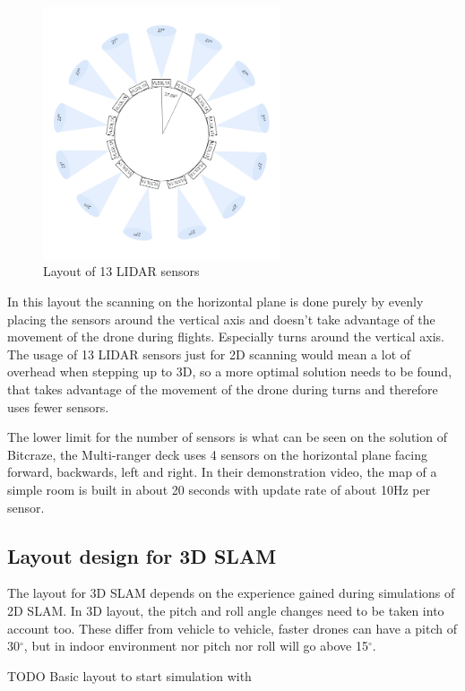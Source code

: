\begin{figure}[ht]
    \centering
    \includegraphics[width=70mm, keepaspectratio]{figures/2d_slam_13sensors.png}
    \caption{Layout of 13 LIDAR sensors}
    \label{fig:2d_13sensor_layout}
\end{figure}

In this layout the scanning on the horizontal plane is done purely by evenly placing the sensors 
around the vertical axis and doesn't take advantage of the movement of the drone during flights. 
Especially turns around the vertical axis. The usage of 13 LIDAR sensors just for 2D scanning would mean 
a lot of overhead when stepping up to 3D, so a more optimal solution needs to be found, that takes
advantage of the movement of the drone during turns and therefore uses fewer sensors. 

The lower limit for the number of sensors is what can be seen on the solution of Bitcraze, 
the Multi-ranger deck\cite{BitcrazeMultirangerDeck} uses 4 sensors on the horizontal plane facing forward, 
backwards, left and right. In their demonstration video, the map of a simple room is built in 
about 20 seconds with update rate of about 10Hz per sensor. 

\subsection{Layout design for 3D SLAM}
The layout for 3D SLAM depends on the experience gained during simulations of 2D SLAM. In 3D layout,
the pitch and roll angle changes need to be taken into account too. These differ from vehicle to vehicle,
faster drones can have a pitch of 30$^{\circ}$, but in indoor environment nor pitch nor roll will go above
15$^{\circ}$. 

TODO Basic layout to start simulation with

